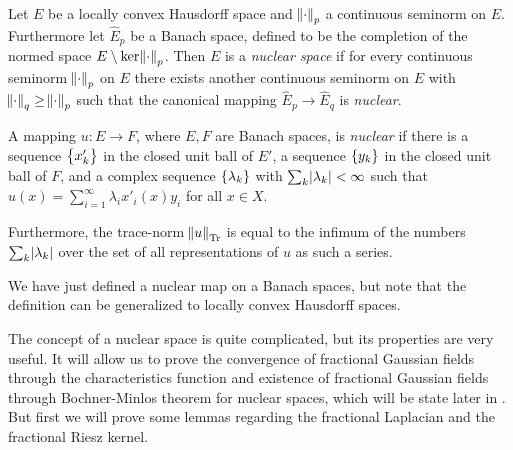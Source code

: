 \medskip
\begin{defi} \label{NuclearSpace}
	Let $E$ be a locally convex Hausdorff space and $\norm{\cdot}_p$ a continuous seminorm on $E$. Furthermore  let $\widehat{E}_{p}$ be a Banach space, defined to be the completion of the normed space $E \setminus \ker \norm{\cdot}_p$. Then $E$ is a \emph{nuclear space} if for every continuous seminorm $\norm{\cdot}_p$ on $E$ there exists  another continuous seminorm on $E$ with $\norm{\cdot}_q \geq \norm{\cdot}_p$ such that the canonical mapping $\widehat{E}_{p} \to \widehat{E}_q$ is \emph{nuclear}. 
	
	A mapping $u\colon E \to F$, where $E,F$ are Banach spaces, is \emph{nuclear} if there is a sequence $\cbr{x'_k}$ in the closed unit ball of $E'$, a sequence $\cbr{y_k}$ in the closed unit ball of $F$, and a complex sequence $\cbr{\lambda_k}$ with $\sum_{k}\abs{\lambda_k} < \infty$ such that $u(x) = \sum_{i = 1}^{\infty} \lambda_i x'_i(x)y_i$ for all $x \in X$. 
	
	Furthermore, the trace-norm $\norm{u}_{\text{Tr}}$ is equal to the infimum of the numbers $\sum_{k} \abs{\lambda_k}$ over the set of all representations of $u$ as such a series.
\end{defi}

\medskip
\begin{remark}
	We have just defined a nuclear map on a Banach spaces, but note that the definition can be generalized to locally convex Hausdorff spaces.
\end{remark}

\medskip
The concept of a nuclear space is quite complicated, but its properties are very useful. It will allow us to prove the convergence of fractional Gaussian fields through the characteristics function and existence of fractional Gaussian fields through Bochner-Minlos theorem for nuclear spaces, which will be state later in . But first we will prove some lemmas regarding the fractional Laplacian and the fractional Riesz kernel.

